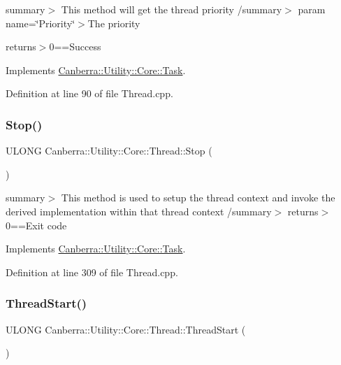 summary$>$ This method will get the thread priority /summary$>$ param name=\char`\"{}\+Priority\char`\"{}$>$The priority

returns$>$0==Success

Implements \hyperlink{class_canberra_1_1_utility_1_1_core_1_1_task}{Canberra\+::\+Utility\+::\+Core\+::\+Task}.



Definition at line 90 of file Thread.\+cpp.

\mbox{\label{class_canberra_1_1_utility_1_1_core_1_1_thread_aef351ecbb4a2fc31d8983bbbcb8ce83e_aef351ecbb4a2fc31d8983bbbcb8ce83e}} 
\subsubsection{\texorpdfstring{Stop()}{Stop()}}
{\footnotesize\ttfamily U\+L\+O\+NG Canberra\+::\+Utility\+::\+Core\+::\+Thread\+::\+Stop (\begin{DoxyParamCaption}{ }\end{DoxyParamCaption})\hspace{0.3cm}{\ttfamily [virtual]}}

summary$>$ This method is used to setup the thread context and invoke the derived implementation within that thread context /summary$>$ returns$>$0==Exit code

Implements \hyperlink{class_canberra_1_1_utility_1_1_core_1_1_task}{Canberra\+::\+Utility\+::\+Core\+::\+Task}.



Definition at line 309 of file Thread.\+cpp.

\mbox{\label{class_canberra_1_1_utility_1_1_core_1_1_thread_aa058eced991ed08cc84117d178d0df78_aa058eced991ed08cc84117d178d0df78}} 
\subsubsection{\texorpdfstring{Thread\+Start()}{ThreadStart()}}
{\footnotesize\ttfamily U\+L\+O\+NG Canberra\+::\+Utility\+::\+Core\+::\+Thread\+::\+Thread\+Start (\begin{DoxyParamCaption}{ }\end{DoxyParamCaption})\hspace{0.3cm}{\ttfamily [protected]}}

